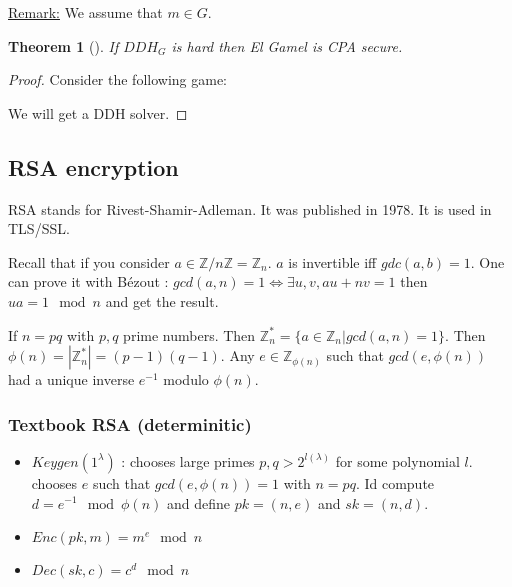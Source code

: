 \documentclass{article}
\newtheorem{thm}{Theorem}[section]
\newcommand{\Thm}[3]{\begin{thm}[#1]\label{#2}#3\end{thm}}
\newcommand{\Rem}{\underline{Remark:} }
\newcommand{\Z}{\mathbb{Z}}
\newcommand{\A}{\mathcal{A}}
\newcommand{\B}{\mathcal{B}}
\begin{document}
\Rem We assume that $m\in G$.

\Thm{}{}{If $DDH_G$ is hard then El Gamel is CPA secure.}

\begin{proof}
Consider the following game:
	
\begin{center}
\end{center}

We will get a DDH solver.
\end{proof}

\subsection{RSA encryption}
RSA stands for Rivest-Shamir-Adleman. It was published in 1978. It is used in TLS/SSL.

Recall that if you consider $a\in\Z/n\Z=\Z_n$. $a$ is invertible iff $gdc(a,b)=1$. One can prove it with Bézout : $gcd(a,n)=1\Leftrightarrow \exists u,v, au+nv=1$ then $ua = 1 \mod{n}$ and get the result.

If $n=pq$ with $p,q$ prime numbers. Then $\Z_n^* = \{a\in\Z_n|gcd(a,n)=1\}$. Then $\phi(n)=|\Z_n^*|=(p-1)(q-1)$. Any $e\in\Z_{\phi(n)}$ such that $gcd(e,\phi(n))$ had a unique inverse $e^{-1}$ modulo $\phi(n)$.

\subsubsection{Textbook RSA (determinitic)}
\begin{itemize}
\item $Keygen(1^\lambda)$ :
\subitem chooses large primes $p,q>2^{l(\lambda)}$ for some polynomial $l$.
\subitem chooses $e$ such that $gcd(e,\phi(n))=1$ with $n=pq$. Id compute $d=e^{-1}\mod{\phi(n)}$ and define $pk=(n,e)$ and $sk=(n,d)$.
\item $Enc(pk,m)=m^e\mod{n}$
\item $Dec(sk,c)=c^d\mod{n}$  
\end{itemize}
\end{document}
